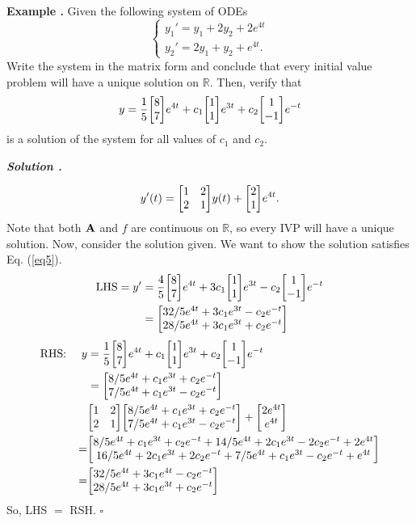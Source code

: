 \documentclass[12pt, a4paper]{article}
\newcounter{index}[subsection]
\newenvironment*{eg}{\begin{framed}\par\noindent\textbf{Example \thesubsection.\stepcounter{index}\theindex}}{\par\end{framed}}
\newcounter{nprf}[subsection]
\newenvironment*{sol}{\par\indent\textbf{\textit{Solution \stepcounter{nprf}\thenprf.}}\par}{\hfill{$\square$}\par}
\def\R{{\mathbb{R}}}
\def\A{\vb A}
\begin{document}
\begin{eg}
	Given the following system of ODEs \[\begin{cases}y_1'=y_1+2y_2+2e^{4t}\\y_2'=2y_1+y_2+e^{4t}.\end{cases}\] Write the system in the matrix form and conclude that every initial value problem will have a unique solution on $\R$. Then, verify that \[y=\dfrac{1}{5}\mqty[8\\7]e^{4t}+c_1\mqty[1\\1]e^{3t}+c_2\mqty[1\\-1]e^{-t}\] is a solution of the system for all values of $c_1$ and $c_2$.
	\begin{sol}
		\begin{equation}\label{eq5}y'(t)=\mqty[1&2\\2&1]y(t)+\mqty[2\\1]e^{4t}.\end{equation} Note that both $\A$ and $f$ are continuous on $\R$, so every IVP will have a unique solution. Now, consider the solution given. We want to show the solution satisfies Eq. (\ref{eq5}). \begin{align*}\text{LHS}=y'&=\dfrac{4}{5}\mqty[8\\7]e^{4t}+3c_1\mqty[1\\1]e^{3t}-c_2\mqty[1\\-1]e^{-t}\\&=\mqty[32/5e^{4t}+3c_1e^{3t}-c_2e^{-t}\\28/5e^{4t}+3c_1e^{3t}+c_2e^{-t}]\end{align*}\begin{align*}\text{RHS: }\quad y&=\dfrac{1}{5}\mqty[8\\7]e^{4t}+c_1\mqty[1\\1]e^{3t}+c_2\mqty[1\\-1]e^{-t}\\&=\mqty[8/5e^{4t}+c_1e^{3t}+c_2e^{-t}\\7/5e^{4t}+c_1e^{3t}-c_2e^{-t}]\\&\mqty[1&2\\2&1]\mqty[8/5e^{4t}+c_1e^{3t}+c_2e^{-t}\\7/5e^{4t}+c_1e^{3t}-c_2e^{-t}]+\mqty[2e^{4t}\\e^{4t}]\\=&\mqty[8/5e^{4t}+c_1e^{3t}+c_2e^{-t}+14/5e^{4t}+2c_1e^{3t}-2c_2e^{-t}+2e^{4t}\\16/5e^{4t}+2c_1e^{3t}+2c_2e^{-t}+7/5e^{4t}+c_1e^{3t}-c_2e^{-t}+e^{4t}]\\=&\mqty[32/5e^{4t}+3c_1e^{4t}-c_2e^{-t}\\28/5e^{4t}+3c_1e^{3t}+c_2e^{-t}]\end{align*} So, LHS $=$ RSH.
	\end{sol}
\end{eg}
\end{document}
